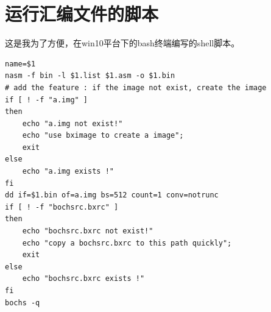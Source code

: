 \documentclass[forprint]{WHUBachelor}
\begin{document}


% 










\appendix

\chapter{运行汇编文件的脚本}

这是我为了方便，在win10平台下的bash终端编写的shell脚本。
\begin{lstlisting}
name=$1
nasm -f bin -l $1.list $1.asm -o $1.bin
# add the feature : if the image not exist, create the image
if [ ! -f "a.img" ]
then
    echo "a.img not exist!"
    echo "use bximage to create a image";
    exit
else
    echo "a.img exists !"
fi
dd if=$1.bin of=a.img bs=512 count=1 conv=notrunc
if [ ! -f "bochsrc.bxrc" ]
then
    echo "bochsrc.bxrc not exist!"
    echo "copy a bochsrc.bxrc to this path quickly";
    exit
else
    echo "bochsrc.bxrc exists !"
fi
bochs -q
\end{lstlisting}

\cleardoublepage
\end{document}
